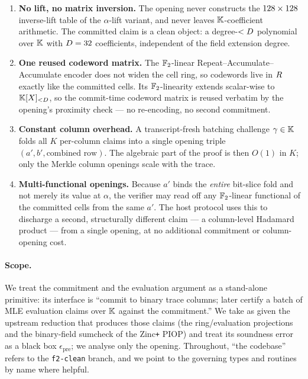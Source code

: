 \begin{enumerate}[leftmargin=2em]
  \item \textbf{No lift, no matrix inversion.} The opening never
    constructs the $128 \times 128$ inverse-lift table of the
    $\alpha$-lift variant, and never leaves $\mathbb{K}$-coefficient arithmetic.
    The committed claim is a clean object: a degree-$<D$ polynomial
    over $\mathbb{K}$ with $D = 32$ coefficients, independent of the field
    extension degree.
  \item \textbf{One reused codeword matrix.} The $\mathbb{F}_2$-linear
    Repeat--Accumulate--Accumulate encoder does not widen the cell ring,
    so codewords live in $R$ exactly like the committed cells.
    Its $\mathbb{F}_2$-linearity extends scalar-wise to $\mathbb{K}[X]_{<D}$, so the
    commit-time codeword matrix is reused verbatim by the opening's
    proximity check --- no re-encoding, no second commitment.
  \item \textbf{Constant column overhead.} A transcript-fresh batching
    challenge $\gamma \in \mathbb{K}$ folds all $K$ per-column claims into a
    single opening triple $(a', b', \text{combined row})$. The algebraic
    part of the proof is then $O(1)$ in $K$; only the Merkle column
    openings scale with the trace.
  \item \textbf{Multi-functional openings.} Because $a'$ binds the
    \emph{entire} bit-slice fold and not merely its value at $\alpha$,
    the verifier may read off any $\mathbb{F}_2$-linear functional of the
    committed cells from the same $a'$. The host protocol uses this to
    discharge a second, structurally different claim --- a column-level
    Hadamard product --- from a single opening, at no additional
    commitment or column-opening cost.
\end{enumerate}

\paragraph{Scope.} We treat the commitment and the evaluation argument
as a stand-alone primitive: its interface is ``commit to binary trace
columns; later certify a batch of MLE evaluation claims over $\mathbb{K}$
against the commitment.'' We take as given the upstream reduction that
produces those claims (the ring/evaluation projections and the
binary-field sumcheck of the Zinc\texttt{+} PIOP) and treat its
soundness error as a black box $\epsilon_{\mathrm{pre}}$; we analyse only
the opening. Throughout, ``the codebase'' refers to the \texttt{f2-clean}
branch, and we point to the governing types and routines by name where
helpful.

